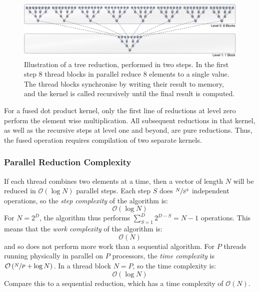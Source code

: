 \begin{figure}[htbp]
    \begin{center}
        \includegraphics[width=\textwidth]{images/sec-4/tree-reduction}
    \end{center}
    \caption[A parallel tree reduction]{Illustration of a tree reduction,
        performed in two steps. In the first step 8 thread blocks in parallel
        reduce 8 elements to a single value. The thread blocks synchronise by
        writing their result to memory, and the kernel is called recursively
        until the final result is computed.}
    \label{fig:tree_reduction}
\end{figure}

For a fused dot product kernel, only the first line of reductions at level zero
perform the element wise multiplication. All subsequent reductions in that
kernel, as well as the recursive steps at level one and beyond, are pure
reductions. Thus, the fused operation requires compilation of two separate
kernels. %

\subsubsection{Parallel Reduction Complexity}
\label{sec:parallel_reduction_complexity}

If each thread combines two elements at a time, then a vector of length $N$ will
be reduced in $\mathcal{O}\left( \log N \right)$ parallel steps. Each step $S$
does $\sfrac{N}{S^2}$ independent operations, so the \emph{step
complexity} of the algorithm is:
\[
\mathcal{O}\left( \log N \right)
\]
For $N=2^{D}$, the algorithm thus performs $\sum_{S=1}^{D}2^{D-S} = N - 1$
operations. This means that the \emph{work complexity} of
the algorithm is:
\[
\mathcal{O}\left( N \right)
\]
and so does not perform more work than a sequential algorithm. For $P$ threads
running physically in parallel on $P$ processors, the \emph{time
complexity} is $\mathcal{O}\left( \sfrac{N}{P} + \log N
\right)$. In a thread block $N = P$, so the time complexity is:
\[
\mathcal{O}\left( \log N \right)
\]
Compare this to a sequential reduction, which has a time complexity of
$\mathcal{O}\left( N \right)$.

